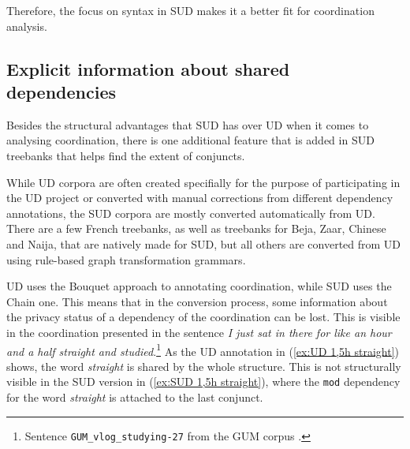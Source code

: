 Therefore, the focus on syntax in SUD makes it a better fit for coordination analysis.

\subsection{Explicit information about shared dependencies}\label{sec:shared-deps}
Besides the structural advantages that SUD has over UD when it comes to analysing coordination, there is one additional feature that is added in SUD treebanks that helps find the extent of conjuncts. 

While UD corpora are often created specifially for the purpose of participating in the UD project or converted with manual corrections from different dependency annotations, the SUD corpora are mostly converted automatically from UD. There are a few French treebanks, as well as treebanks for Beja, Zaar, Chinese and Naija, that are natively made for SUD, but all others are converted from UD using rule-based graph transformation grammars. 

UD uses the Bouquet approach to annotating coordination, while SUD uses the Chain one. This means that in the conversion process, some information about the privacy status of a dependency of the coordination can be lost. This is visible in the coordination presented in the sentence \textsl{I just sat in there for like an hour and a half straight and studied}.\footnote{Sentence \texttt{GUM\_vlog\_studying-27} from the GUM corpus \citep{Zeldes2017}.} As the UD annotation in (\ref{ex:UD 1,5h straight}) shows, the word \textsl{straight} is shared by the whole structure. This is not structurally visible in the SUD version in (\ref{ex:SUD 1,5h straight}), where the \texttt{mod} dependency for the word \textsl{straight} is attached to the last conjunct. 

